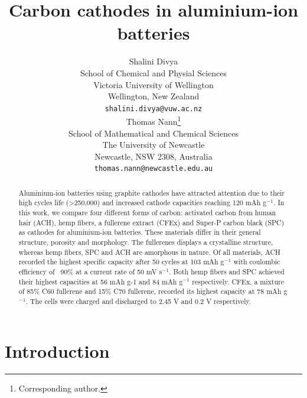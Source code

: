 \documentclass{article}
\title{Carbon cathodes in aluminium-ion batteries}
\author{
  Shalini Divya\\
  School of Chemical and Physial Sciences\\
  Victoria University of Wellington\\
  Wellington, New Zealand\\
  \texttt{shalini.divya@vuw.ac.nz}\\
   \And
  Thomas Nann\thanks{Corresponding author.}\\
  School of Mathematical and Chemical Sciences\\
  The University of Newcastle\\
  Newcastle, NSW 2308, Australia\\
  \texttt{thomas.nann@newcastle.edu.au}\\
}
\begin{document}
\maketitle

\begin{abstract}

Aluminium-ion batteries using graphite cathodes have attracted attention due to their high cycles life (>250,000) and increased cathode capacities reaching 120 mAh g$^-{^1}$. In this work, we compare four different forms of carbon: activated carbon from human hair (ACH), hemp fibers, a fullerene extract (CFEx) and Super-P carbon black (SPC) as cathodes for aluminium-ion batteries. These materials differ in their general structure, porosity and morphology. The fullerenes displays a crystalline structure, whereas hemp fibers, SPC and ACH are amorphous in nature. Of all materials, ACH recorded the highest specific capacity after 50 cycles at 103 mAh g$^-{^1}$ with coulombic efficiency of ~90\% at a current rate of 50 mV s$^-{^1}$. Both hemp fibers and SPC achieved their highest capacities at 56 mAh g-1 and 84 mAh g$^-{^1}$ respectively. CFEx, a mixture of 85\% C60 fullerene and 15\% C70 fullerene, recorded its highest capacity at 78 mAh g$^-{^1}$. The cells were charged and discharged to 2.45 V and 0.2 V respectively. 

\end{abstract}



\section{Introduction}
\end{document}
